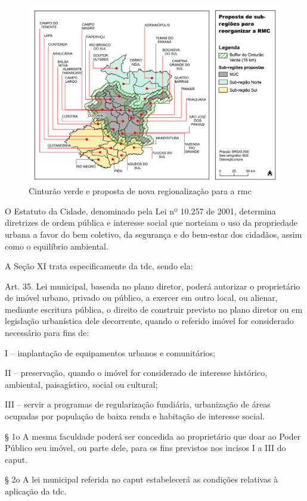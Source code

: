 	\begin{landscape}
		\begin{figure}
			\centering
			\caption{Cinturão verde e proposta de nova regionalização para a \glsdesc{rmc}}
			\label{fig:rmcsubregioes}
			\includegraphics[width=0.85\linewidth]{../gis/produtos/RMC_subregioes}
		\end{figure}
	\end{landscape}
	
	O Estatuto da Cidade, denominado pela Lei nº 10.257 de 2001, determina diretrizes de ordem pública e interesse social que norteiam o uso da propriedade urbana a favor do bem coletivo, da segurança e do bem-estar dos cidadãos, assim como o equilíbrio ambiental.
	
	A Seção XI trata especificamente da \glsdesc{tdc}, sendo ela:
	
	\begin{citacao}
		Art. 35. Lei municipal, baseada no plano diretor, poderá autorizar o proprietário de imóvel urbano, privado ou público, a exercer em outro local, ou alienar, mediante escritura pública, o direito de construir previsto no plano diretor ou em legislação urbanística dele decorrente, quando o referido imóvel for considerado necessário para fins de:
		
		I – implantação de equipamentos urbanos e comunitários;
		
		II – preservação, quando o imóvel for considerado de interesse histórico, ambiental, paisagístico, social ou cultural;
		
		III – servir a programas de regularização fundiária, urbanização de áreas ocupadas por população de baixa renda e habitação de interesse social.
		
		§ 1o A mesma faculdade poderá ser concedida ao proprietário que doar ao Poder Público seu imóvel, ou parte dele, para os fins previstos nos incisos I a III do caput.
		
		§ 2o A lei municipal referida no caput estabelecerá as condições relativas à aplicação da \glsdesc{tdc}. \cite{brasil2001a}
	\end{citacao}

